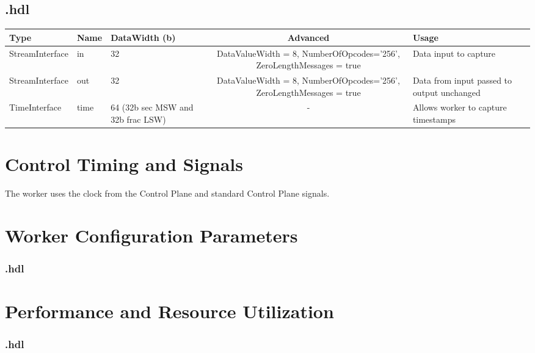 \begin{landscape}
\subsection*{\comp.hdl}
\begin{scriptsize}
\begin{tabular}{|M{2.5cm}|M{2.5cm}|M{3cm}|c|M{3.5cm}|M{3.5cm}|}
             \hline
             Type    & Name & DataWidth (b) & Advanced  & Usage     \\
             \hline
             StreamInterface & in   & 32  & DataValueWidth = 8, NumberOfOpcodes='256', ZeroLengthMessages = true  & Data input to capture \\
            \hline
            StreamInterface & out   & 32  & DataValueWidth = 8, NumberOfOpcodes='256', ZeroLengthMessages = true  & Data from input passed to output unchanged \\
            \hline
            TimeInterface & time  & 64 (32b sec MSW and 32b frac LSW) & - & Allows worker to capture timestamps \\
            \hline
\end{tabular}
\end{scriptsize}
\end{landscape}

\section*{Control Timing and Signals}
\begin{flushleft}
The {\comp} worker uses the clock from the Control Plane and standard Control Plane signals.
\end{flushleft}

\begin{landscape}
\section*{Worker Configuration Parameters}
\subsubsection*{\comp.hdl}

\section*{Performance and Resource Utilization}
\subsubsection*{\comp.hdl}

\end{landscape}

